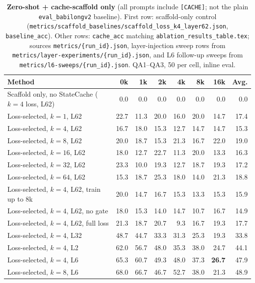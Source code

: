 \begin{table}[t]
\centering
\small
\setlength{\tabcolsep}{4pt}
\caption{\textbf{Zero-shot + cache-scaffold only} (all prompts include \texttt{[CACHE]}; not the plain \texttt{eval\_babilongv2} baseline). First row: scaffold-only control (\texttt{metrics/scaffold\_baselines/scaffold\_loss\_k4\_layer62.json}, \texttt{baseline\_acc}). Other rows: \texttt{cache\_acc} matching \texttt{ablation\_results\_table.tex}; sources \texttt{metrics/\{run\_id\}.json}, layer-injection sweep rows from \texttt{metrics/layer-experiments/\{run\_id\}.json}, and L6 follow-up sweeps from \texttt{metrics/l6-sweeps/\{run\_id\}.json}. QA1--QA3, 50 per cell, inline eval.}
\label{tab:babilong-cache-scaffold-zero-shot}
\begin{tabular}{lrrrrrrr}
\toprule
\textbf{Method} & \textbf{0k} & \textbf{1k} & \textbf{2k} & \textbf{4k} & \textbf{8k} & \textbf{16k} & \textbf{Avg.} \\
\midrule
Scaffold only, no StateCache ($k{=}4$ loss, L62) & 0.0 & 0.0 & 0.0 & 0.0 & 0.0 & 0.0 & 0.0 \\
\midrule
Loss-selected, $k=1$, L62 & 22.7 & 11.3 & 20.0 & 16.0 & 20.0 & 14.7 & 17.4 \\
Loss-selected, $k=4$, L62 & 16.7 & 18.0 & 15.3 & 12.7 & 14.7 & 14.7 & 15.3 \\
Loss-selected, $k=8$, L62 & 20.0 & 18.7 & 15.3 & 21.3 & 16.7 & 22.0 & 19.0 \\
Loss-selected, $k=16$, L62 & 18.0 & 12.7 & 22.7 & 11.3 & 20.0 & 13.3 & 16.3 \\
Loss-selected, $k=32$, L62 & 23.3 & 10.0 & 19.3 & 12.7 & 18.7 & 19.3 & 17.2 \\
Loss-selected, $k=64$, L62 & 15.3 & 18.7 & 25.3 & 18.0 & 14.0 & 21.3 & 18.8 \\
Loss-selected, $k=4$, L62, train up to 8k & 20.0 & 14.7 & 16.7 & 15.3 & 13.3 & 15.3 & 15.9 \\
Loss-selected, $k=4$, L62, no gate & 18.0 & 15.3 & 14.0 & 14.7 & 10.7 & 16.7 & 14.9 \\
Loss-selected, $k=4$, L62, full loss & 21.3 & 18.7 & 20.7 & 9.3 & 16.7 & 19.3 & 17.7 \\
Loss-selected, $k=4$, L32 & 48.7 & 44.7 & 33.3 & 31.3 & 25.3 & 19.3 & 33.8 \\
Loss-selected, $k=4$, L2 & 62.0 & 56.7 & 48.0 & 35.3 & 38.0 & 24.7 & 44.1 \\
Loss-selected, $k=4$, L6 & 65.3 & 60.7 & 49.3 & 48.0 & 37.3 & \textbf{26.7} & 47.9 \\
Loss-selected, $k=8$, L6 & 68.0 & 66.7 & 46.7 & 52.7 & 38.0 & 21.3 & 48.9 \\

\end{tabular}
\end{table}
